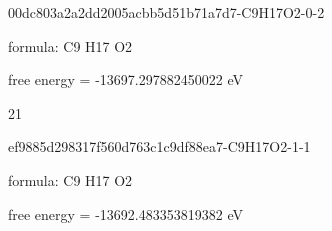 \documentclass{article}
\begin{document}
\vspace{1cm}


00dc803a2a2dd2005acbb5d51b71a7d7-C9H17O2-0-2



formula: C9 H17 O2



free energy = -13697.297882450022 eV

21

\vspace{1cm}


ef9885d298317f560d763c1c9df88ea7-C9H17O2-1-1



formula: C9 H17 O2



free energy = -13692.483353819382 eV
\end{document}
